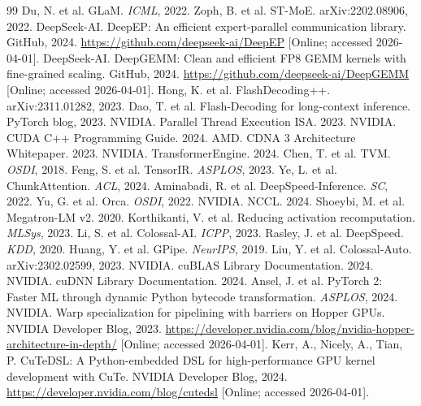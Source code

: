 \documentclass[10pt]{article}
\begin{document}
\begin{thebibliography}{99}
 Du, N. et al. GLaM. \emph{ICML}, 2022.
 Zoph, B. et al. ST-MoE. arXiv:2202.08906, 2022.
 DeepSeek-AI. DeepEP: An efficient expert-parallel communication library. GitHub, 2024. \url{https://github.com/deepseek-ai/DeepEP} [Online; accessed 2026-04-01].
 DeepSeek-AI. DeepGEMM: Clean and efficient FP8 GEMM kernels with fine-grained scaling. GitHub, 2024. \url{https://github.com/deepseek-ai/DeepGEMM} [Online; accessed 2026-04-01].
 Hong, K. et al. FlashDecoding++. arXiv:2311.01282, 2023.
 Dao, T. et al. Flash-Decoding for long-context inference. PyTorch blog, 2023.
 NVIDIA. Parallel Thread Execution ISA. 2023.
 NVIDIA. CUDA C++ Programming Guide. 2024.
 AMD. CDNA 3 Architecture Whitepaper. 2023.
 NVIDIA. TransformerEngine. 2024.
 Chen, T. et al. TVM. \emph{OSDI}, 2018.
 Feng, S. et al. TensorIR. \emph{ASPLOS}, 2023.
 Ye, L. et al. ChunkAttention. \emph{ACL}, 2024.
 Aminabadi, R. et al. DeepSpeed-Inference. \emph{SC}, 2022.
 Yu, G. et al. Orca. \emph{OSDI}, 2022.
 NVIDIA. NCCL. 2024.
 Shoeybi, M. et al. Megatron-LM v2. 2020.
 Korthikanti, V. et al. Reducing activation recomputation. \emph{MLSys}, 2023.
 Li, S. et al. Colossal-AI. \emph{ICPP}, 2023.
 Rasley, J. et al. DeepSpeed. \emph{KDD}, 2020.
 Huang, Y. et al. GPipe. \emph{NeurIPS}, 2019.
 Liu, Y. et al. Colossal-Auto. arXiv:2302.02599, 2023.
 NVIDIA. cuBLAS Library Documentation. 2024.
 NVIDIA. cuDNN Library Documentation. 2024.
 Ansel, J. et al. PyTorch 2: Faster ML through dynamic Python bytecode transformation. \emph{ASPLOS}, 2024.
 NVIDIA. Warp specialization for pipelining with barriers on Hopper GPUs. NVIDIA Developer Blog, 2023. \url{https://developer.nvidia.com/blog/nvidia-hopper-architecture-in-depth/} [Online; accessed 2026-04-01].
 Kerr, A., Nicely, A., Tian, P. CuTeDSL: A Python-embedded DSL for high-performance GPU kernel development with CuTe. NVIDIA Developer Blog, 2024. \url{https://developer.nvidia.com/blog/cutedsl} [Online; accessed 2026-04-01].

\end{thebibliography}
\end{document}
